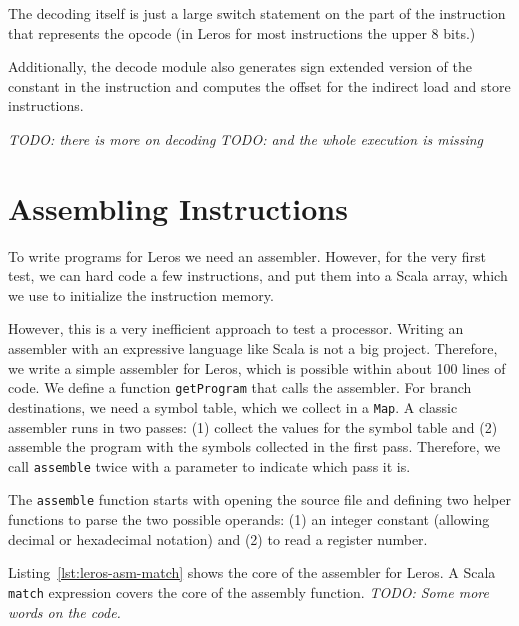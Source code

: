 \documentclass[%
    10pt,
    headinclude, footexclude,
    openright, %
    notitlepage,
    cleardoubleempty,
    headsepline,
    pointlessnumbers,
    bibtotoc, idxtotoc,
    ]{scrbook}
\newcommand{\code}[1]{{\small{\texttt{#1}}}}
\newcommand{\todo}[1]{{\emph{TODO: #1}}}
\begin{document}

\noindent The decoding itself is just a large switch statement on the part of the
instruction that represents the opcode (in Leros for most instructions the upper
8 bits.)


Additionally, the decode module also generates sign extended version of the
constant in the instruction and computes the offset for the indirect load and
store instructions.

\todo{there is more on decoding}
\todo{and the whole execution is missing}

\section{Assembling Instructions}


To write programs for Leros we need an assembler. However, for the very first
test, we can hard code a few instructions, and put them into a Scala array,
which we use to initialize the instruction memory.


\noindent However, this is a very inefficient approach to test a processor.
Writing an assembler with an expressive language like Scala is not a big project.
Therefore, we write a simple assembler for Leros, which is possible within about
100 lines of code. We define a function \code{getProgram} that calls the assembler.
For branch destinations, we need a symbol table, which we collect in a \code{Map}.
A classic assembler runs in two passes: (1) collect the values for the symbol table
and (2) assemble the program with the symbols collected in the first pass.
Therefore, we call \code{assemble} twice with a parameter to indicate which pass it is.


The \code{assemble} function starts with opening the source file
and defining two helper functions to parse the two possible operands: (1) an
integer constant (allowing decimal or hexadecimal notation) and (2) to read
a register number.


Listing~\ref{lst:leros-asm-match} shows the core of the assembler for Leros.
A Scala \code{match} expression covers the core of the assembly function.
\todo{Some more words on the code.}
\end{document}

